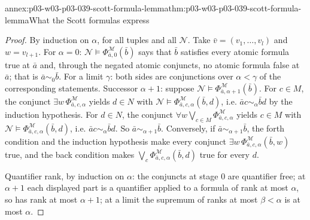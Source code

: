 \begin{annexitem}{annex:p03-w03-p03-039-scott-formula-lemma}{thm:p03-w03-p03-039-scott-formula-lemma}{What the Scott formulas express}
\begin{proof}
By induction on \(\alpha\), for all tuples and all \(\mathcal N\). Take
\(\bar v=(v_1,\ldots,v_l)\) and \(w=v_{l+1}\). For \(\alpha=0\):
\(\mathcal N\models\Phi^{\mathcal M}_{\bar a,0}(\bar b)\) says that \(\bar b\)
satisfies every atomic formula true at \(\bar a\) and, through the negated
atomic conjuncts, no atomic formula false at \(\bar a\); that is
\(\bar a\sim_0\bar b\). For a limit \(\gamma\): both sides are conjunctions
over \(\alpha<\gamma\) of the corresponding statements. Successor
\(\alpha+1\): suppose \(\mathcal N\models\Phi^{\mathcal M}_{\bar a,\alpha+1}(\bar b)\).
For \(c\in M\), the conjunct \(\exists w\,\Phi^{\mathcal M}_{\bar a,c,\alpha}\)
yields \(d\in N\) with \(\mathcal N\models\Phi^{\mathcal M}_{\bar a,c,\alpha}(\bar b,d)\),
i.e. \(\bar ac\sim_\alpha\bar bd\) by the induction hypothesis. For
\(d\in N\), the conjunct \(\forall w\bigvee_{c\in M}\Phi^{\mathcal M}_{\bar a,c,\alpha}\)
yields \(c\in M\) with \(\mathcal N\models\Phi^{\mathcal M}_{\bar a,c,\alpha}(\bar b,d)\),
i.e. \(\bar ac\sim_\alpha\bar bd\). So \(\bar a\sim_{\alpha+1}\bar b\).
Conversely, if \(\bar a\sim_{\alpha+1}\bar b\), the forth condition and the
induction hypothesis make every conjunct
\(\exists w\,\Phi^{\mathcal M}_{\bar a,c,\alpha}(\bar b,w)\) true, and the
back condition makes \(\bigvee_{c}\Phi^{\mathcal M}_{\bar a,c,\alpha}(\bar b,d)\)
true for every \(d\).

Quantifier rank, by induction on \(\alpha\): the conjuncts at stage \(0\) are
quantifier free; at \(\alpha+1\) each displayed part is a quantifier applied
to a formula of rank at most \(\alpha\), so has rank at most \(\alpha+1\);
at a limit the supremum of ranks at most \(\beta<\alpha\) is at most
\(\alpha\).
\end{proof}
\end{annexitem}

